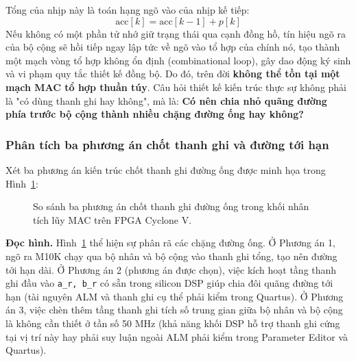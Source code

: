 Tổng của nhịp này là toán hạng ngõ vào của nhịp kế tiếp:
\begin{equation}
\text{acc}[k] = \text{acc}[k-1] + p[k]
\end{equation}
Nếu không có một phần tử nhớ giữ trạng thái qua cạnh đồng hồ, tín hiệu ngõ ra của bộ cộng sẽ hồi tiếp ngay lập tức về ngõ vào tổ hợp của chính nó, tạo thành một mạch vòng tổ hợp không ổn định (combinational loop), gây dao động ký sinh và vi phạm quy tắc thiết kế đồng bộ. Do đó, trên đời \textbf{không thể tồn tại một mạch MAC tổ hợp thuần túy}. Câu hỏi thiết kế kiến trúc thực sự không phải là "có dùng thanh ghi hay không", mà là: \textbf{Có nên chia nhỏ quãng đường phía trước bộ cộng thành nhiều chặng đường ống hay không?}

\subsubsection*{Phân tích ba phương án chốt thanh ghi và đường tới hạn}
Xét ba phương án kiến trúc chốt thanh ghi đường ống được minh họa trong Hình~\ref{fig:ch07_pipeline_options}:

\begin{figure}[H]
\centering
\resizebox{0.92\textwidth}{!}{}
\caption{So sánh ba phương án chốt thanh ghi đường ống trong khối nhân tích lũy MAC trên FPGA Cyclone V.}
\label{fig:ch07_pipeline_options}
\end{figure}

\textbf{Đọc hình.} Hình~\ref{fig:ch07_pipeline_options} thể hiện sự phân rã các chặng đường ống. Ở Phương án 1, ngõ ra M10K chạy qua bộ nhân và bộ cộng vào thanh ghi tổng, tạo nên đường tới hạn dài. Ở Phương án 2 (phương án được chọn), việc kích hoạt tầng thanh ghi đầu vào \texttt{a\_r, b\_r} có sẵn trong silicon DSP giúp chia đôi quãng đường tới hạn (tài nguyên ALM và thanh ghi cụ thể phải kiểm trong Quartus). Ở Phương án 3, việc chèn thêm tầng thanh ghi tích số trung gian giữa bộ nhân và bộ cộng là không cần thiết ở tần số 50 MHz (khả năng khối DSP hỗ trợ thanh ghi cứng tại vị trí này hay phải suy luận ngoài ALM phải kiểm trong Parameter Editor và Quartus).

